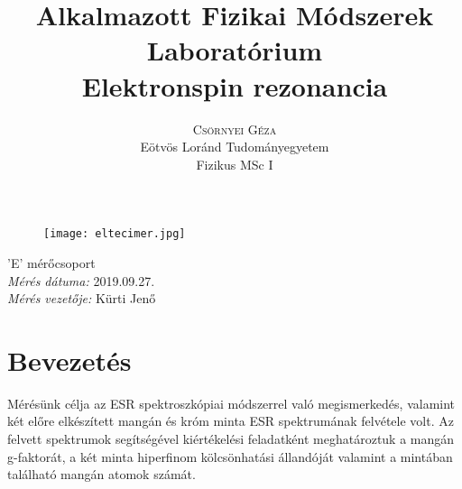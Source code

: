 \documentclass[12pt,a4paper]{article}
\title{\huge{Alkalmazott Fizikai Módszerek Laboratórium}\\ \vspace{20pt}
\textbf{Elektronspin rezonancia}}
\author{\Large{\textsc{Csörnyei Géza}} \vspace{10pt}\\
	\textrm{Eötvös Loránd Tudományegyetem}\\
	\textrm{Fizikus MSc I}
	}
\date{}
\begin{document}
\addtolength{\voffset}{-1.0cm}
\addtolength{\textheight}{1.0cm}
\begin{titlepage}
\maketitle

\begin{figure}[!htb]
\centering
\texttt{[image: eltecimer.jpg]}
\end{figure}

\hfil \Large{'E' mérőcsoport}\hfil  \\
\vspace*{2pt}
\hfil \Large{\emph{Mérés dátuma:} 2019.09.27.}\hfil \\
\vspace*{2pt}
\hfil \hspace*{45pt} \Large{\emph{Mérés vezetője:} Kürti Jenő}\hfil
\thispagestyle{empty}
\end{titlepage}

\section{Bevezetés}
\hspace*{10pt} Mérésünk célja az ESR spektroszkópiai módszerrel való megismerkedés, valamint két előre elkészített mangán és króm minta ESR spektrumának felvétele volt. Az felvett spektrumok segítségével kiértékelési feladatként meghatároztuk a mangán g-faktorát, a két minta hiperfinom kölcsönhatási állandóját valamint a mintában található mangán atomok számát.
\end{document}

